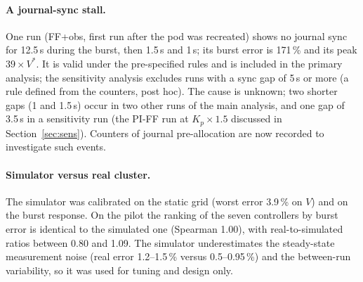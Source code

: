 \documentclass[smallextended]{svjour3}
\begin{document}
\paragraph{A journal-sync stall.}
One run (FF+obs, first run after the pod was recreated) shows no journal sync for 12.5\,s during the burst, then 1.5\,s and 1\,s; its burst error is 171\,\% and its peak $39\times V^*$. It is valid under the
pre-specified rules and is included in the primary analysis; the sensitivity analysis excludes runs with a sync gap of 5\,s or more (a rule defined from the counters, post hoc). The cause is unknown; two shorter gaps (1 and 1.5\,s) occur in two other runs of the main analysis, and one gap of 3.5\,s in a sensitivity run (the PI-FF run at $K_p\times1.5$ discussed in Section~\ref{sec:sens}). Counters of journal pre-allocation are now recorded to investigate such events.

\paragraph{Simulator versus real cluster.}
The simulator was calibrated on the static grid (worst error 3.9\,\% on $V$) and on the burst response. On the pilot the ranking of the seven controllers by burst error is identical to the simulated
one (Spearman 1.00), with real-to-simulated ratios between 0.80 and 1.09. The simulator underestimates the steady-state measurement noise (real error 1.2--1.5\,\% versus 0.5--0.95\,\%) and the between-run variability,
so it was used for tuning and design only.
\end{document}
